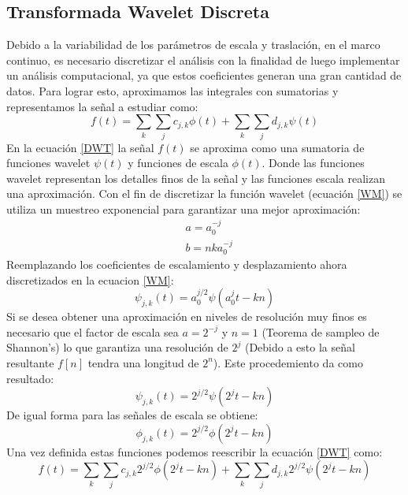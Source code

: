\documentclass{article}
\begin{document}
\subsection*{Transformada Wavelet Discreta}
Debido a la variabilidad de los parámetros de escala y traslación, en el marco continuo, es necesario discretizar el análisis con la finalidad 
de luego implementar un análisis computacional, ya que estos coeficientes generan una gran cantidad de datos. Para lograr esto, aproximamos las integrales con sumatorias y representamos la 
señal a estudiar como:
\begin{equation}
    \label{DWT}
 f(t) = \sum_{k}\sum_{j} c_{j,k}\phi (t) + \sum_{k}\sum_{j} d_{j,k}\psi (t)
\end{equation}
En la ecuación \ref{DWT} la señal $f(t)$ se aproxima como una sumatoria de funciones wavelet $\psi (t)$ y funciones de escala $\phi (t)$. Donde las funciones wavelet representan los detalles finos de la señal y las funciones escala 
realizan una aproximación. Con el fin de discretizar la función wavelet (ecuación \ref{WM}) se utiliza un muestreo exponencial para garantizar una mejor aproximación:
\begin{equation}
    \begin{split}
        &a=a_0^{-j}\\
        &b=nka_0^{-j}
    \end{split}
\end{equation}
Reemplazando los coeficientes de escalamiento y desplazamiento ahora discretizados en la ecuacion \ref{WM}:
\begin{equation}
    \psi_{j,k}(t) = a_0^{j/2} \psi (a_0^jt-kn)
\end{equation}
Si se desea obtener una aproximación en niveles de resolución muy finos es necesario que el factor de escala sea $a=2^{-j}$ y $n=1$ (Teorema de sampleo de Shannon's) lo que garantiza una resolución de 
$2^j$ (Debido a esto la señal resultante $f[n]$ tendra una longitud de $2^n$). Este procedemiento da como resultado:
\begin{equation}
    \psi_{j,k}(t) = 2^{j/2} \psi (2^jt-kn)
\end{equation}
De igual forma para las señales de escala se obtiene:
\begin{equation}
    \phi_{j,k}(t) = 2^{j/2} \phi (2^jt-kn)
\end{equation}
Una vez definida estas funciones podemos reescribir la ecuación \ref{DWT} como:
\begin{equation}
    f(t) = \sum_{k}\sum_{j} c_{j,k}2^{j/2} \phi (2^jt-kn)  + \sum_{k}\sum_{j} d_{j,k}2^{j/2} \psi (2^jt-kn)
\end{equation}
\end{document}
